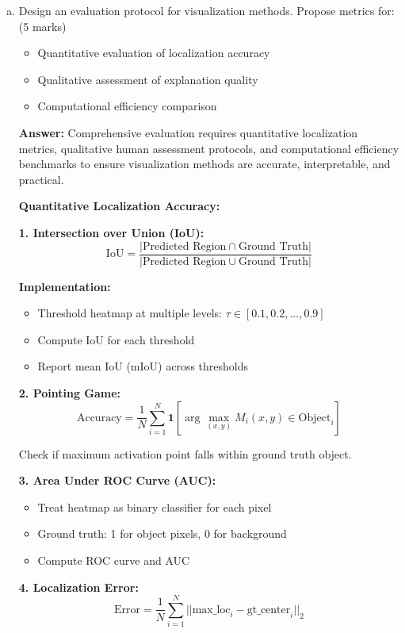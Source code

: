 \documentclass[12pt]{article}
\newcommand{\answer}[1]{{\color{answercolor}\textbf{Answer:} #1}}
\newcommand{\explanation}[1]{{\color{explanationcolor}#1}}
\begin{document}
\begin{enumerate}[(a)]
    \item Design an evaluation protocol for visualization methods. Propose metrics for: \hfill (5 marks)
    \begin{itemize}
        \item Quantitative evaluation of localization accuracy
        \item Qualitative assessment of explanation quality
        \item Computational efficiency comparison
    \end{itemize}
    
    \answer{Comprehensive evaluation requires quantitative localization metrics, qualitative human assessment protocols, and computational efficiency benchmarks to ensure visualization methods are accurate, interpretable, and practical.}
    
    \explanation{
    \textbf{Quantitative Localization Accuracy:}
    
    \textbf{1. Intersection over Union (IoU):}
    $$\text{IoU} = \frac{|\text{Predicted Region} \cap \text{Ground Truth}|}{|\text{Predicted Region} \cup \text{Ground Truth}|}$$
    
    \textbf{Implementation:}
    \begin{itemize}
        \item Threshold heatmap at multiple levels: $\tau \in [0.1, 0.2, ..., 0.9]$
        \item Compute IoU for each threshold
        \item Report mean IoU (mIoU) across thresholds
    \end{itemize}
    
    \textbf{2. Pointing Game:}
    $$\text{Accuracy} = \frac{1}{N} \sum_{i=1}^N \mathbf{1}[\arg\max_{(x,y)} M_i(x,y) \in \text{Object}_i]$$
    
    Check if maximum activation point falls within ground truth object.
    
    \textbf{3. Area Under ROC Curve (AUC):}
    \begin{itemize}
        \item Treat heatmap as binary classifier for each pixel
        \item Ground truth: 1 for object pixels, 0 for background
        \item Compute ROC curve and AUC
    \end{itemize}
    
    \textbf{4. Localization Error:}
    $$\text{Error} = \frac{1}{N} \sum_{i=1}^N ||\text{max\_loc}_i - \text{gt\_center}_i||_2$$
    
}
\end{enumerate}
\end{document}
